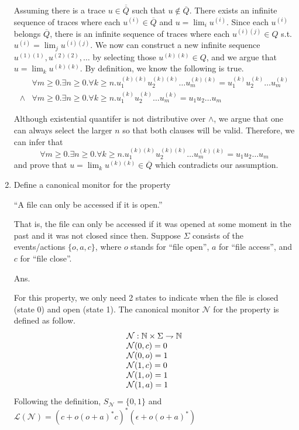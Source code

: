 \documentclass{article}
\begin{document}
\begin{enumerate}
Assuming there is a trace $u \in \overline{\overline{Q}}$ such that
$u \notin \overline{Q}$.
There exists an infinite sequence of traces where each $u^{(i)} \in \overline{Q}$
and $u = \lim_i u^{(i)}$.
Since each $u^{(i)}$ belongs $\overline{Q}$,
there is an infinite sequence of traces where each $u^{(i)(j)} \in Q$ s.t.
$u^{(i)} = \lim_j u^{(i)(j)}$.
We now can construct a new infinite sequence $u^{(1)(1)}, u^{(2)(2)}, \dots$
by selecting those $u^{(k)(k)} \in Q$,
and we argue that $u = \lim_k u^{(k)(k)}$.
By definition, we know the following is true.
$$
\begin{array}{rl}
      & \forall m\geq 0. \exists n\geq 0 . \forall k \geq n.
        u^{(k)(k)}_1 u^{(k)(k)}_2\dots u^{(k)(k)}_m = u^{(k)}_1 u^{(k)}_2 \dots u^{(k)}_m \\
\land & \forall m\geq 0. \exists n\geq 0 . \forall k \geq n.
        u^{(k)}_1 u^{(k)}_2\dots u^{(k)}_m = u_1 u_2 \dots u_m
\end{array}
$$

Although existential quantifer is not distributive over $\land$,
we argue that one can always select the larger $n$ so that
both clauses will be valid.
Therefore, we can infer that
$$
\forall m\geq 0. \exists n\geq 0 . \forall k \geq n.
u^{(k)(k)}_1 u^{(k)(k)}_2\dots u^{(k)(k)}_m = u_1 u_2 \dots u_m
$$
and prove that $u = \lim_k u^{(k)(k)} \in \overline{Q}$ which
contradicts our assumption. 

\item Define a canonical monitor for the property
\begin{center}
``A file can only be accessed if it is open.''
\end{center}
That is, the file can only be accessed if it was opened at some moment
in the past and it was not closed since then.
Suppose $\Sigma$ consists of the events/actions $\{o,a,c\}$,
where $o$ stands for ``file open'', $a$ for ``file access'',
and $c$ for ``file close''.

Ans.

\newcommand{\monitor}{\ensuremath{\mathcal{N}}\xspace}
For this property, we only need 2 states to indicate
when the file is closed (state 0) and open (state 1).
The canonical monitor \monitor for the property is defined as follow.
$$
\begin{array}{l}
\monitor : \Nat \times \Sigma \rightharpoondown \Nat \\
\monitor(0, c) = 0\\
\monitor(0, o) = 1\\
\monitor(1, c) = 0\\
\monitor(1, o) = 1\\
\monitor(1, a) = 1
\end{array}
$$
Following the definition, $S_\monitor = \{0, 1\}$ and
$\mathcal{L}(\monitor) = (c+o(o+a)^*c)^*(\epsilon+o(o+a)^*)$

\end{enumerate}
\end{document}
